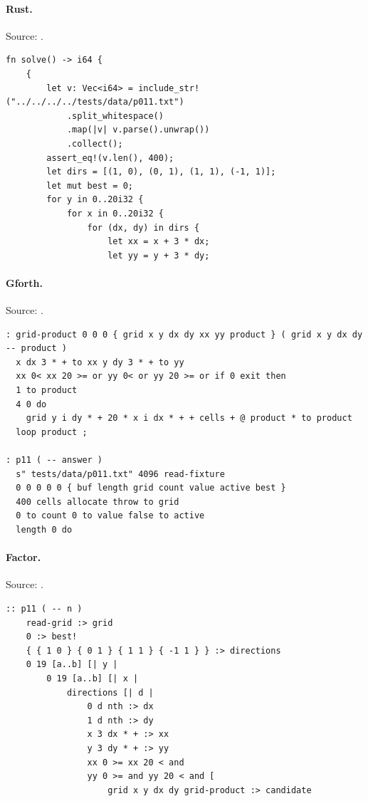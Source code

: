 \paragraph{Rust.} Source: .
\begin{lstlisting}
fn solve() -> i64 {
    {
        let v: Vec<i64> = include_str!("../../../../tests/data/p011.txt")
            .split_whitespace()
            .map(|v| v.parse().unwrap())
            .collect();
        assert_eq!(v.len(), 400);
        let dirs = [(1, 0), (0, 1), (1, 1), (-1, 1)];
        let mut best = 0;
        for y in 0..20i32 {
            for x in 0..20i32 {
                for (dx, dy) in dirs {
                    let xx = x + 3 * dx;
                    let yy = y + 3 * dy;
\end{lstlisting}

\paragraph{Gforth.} Source: .
\begin{lstlisting}
: grid-product 0 0 0 { grid x y dx dy xx yy product } ( grid x y dx dy -- product )
  x dx 3 * + to xx y dy 3 * + to yy
  xx 0< xx 20 >= or yy 0< or yy 20 >= or if 0 exit then
  1 to product
  4 0 do
    grid y i dy * + 20 * x i dx * + + cells + @ product * to product
  loop product ;

: p11 ( -- answer )
  s" tests/data/p011.txt" 4096 read-fixture
  0 0 0 0 0 { buf length grid count value active best }
  400 cells allocate throw to grid
  0 to count 0 to value false to active
  length 0 do
\end{lstlisting}

\paragraph{Factor.} Source: .
\begin{lstlisting}
:: p11 ( -- n )
    read-grid :> grid
    0 :> best!
    { { 1 0 } { 0 1 } { 1 1 } { -1 1 } } :> directions
    0 19 [a..b] [| y |
        0 19 [a..b] [| x |
            directions [| d |
                0 d nth :> dx
                1 d nth :> dy
                x 3 dx * + :> xx
                y 3 dy * + :> yy
                xx 0 >= xx 20 < and
                yy 0 >= and yy 20 < and [
                    grid x y dx dy grid-product :> candidate
\end{lstlisting}

